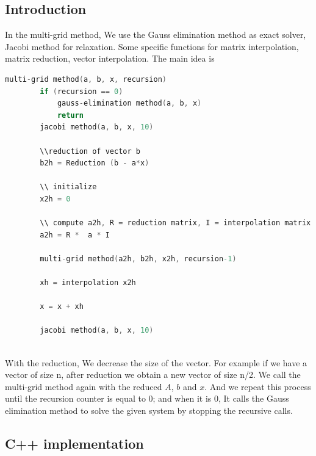 \subsection{Introduction}

In the multi-grid method, We use the Gauss elimination method as exact solver, Jacobi method for relaxation. Some specific functions for matrix interpolation, matrix reduction, vector interpolation. The main idea is \\
\begin{lstlisting}[language=C, caption=multigrid method idea]
	multi-grid method(a, b, x, recursion)
		if (recursion == 0)
			gauss-elimination method(a, b, x)
			return 
		jacobi method(a, b, x, 10)
		
		\\reduction of vector b
		b2h = Reduction (b - a*x)
		
		\\ initialize 
		x2h = 0
		
		\\ compute a2h, R = reduction matrix, I = interpolation matrix
		a2h = R *  a * I
		
		multi-grid method(a2h, b2h, x2h, recursion-1)
		
		xh = interpolation x2h
		
		x = x + xh
		
		jacobi method(a, b, x, 10)
		
\end{lstlisting}
 
With the reduction, We decrease the size of the vector. For example if we have a vector of size n, after reduction we obtain a new vector of size n/2. We call the multi-grid method again with the reduced  $A$, $b$ and $x$. And we repeat this process until the recursion counter is equal to 0; and when it is 0, It calls the Gauss elimination method to solve the given system by stopping the recursive calls.
 

\subsection{C++ implementation}

